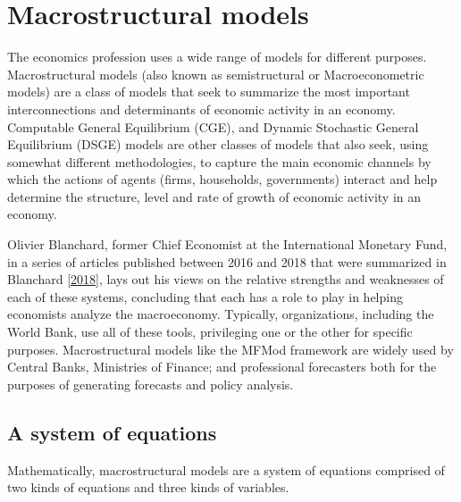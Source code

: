 \documentclass[letterpaper,10pt,english]{jupyterBook}
\begin{document}
\section{Macrostructural models}
\label{\detokenize{content/02_MacrostructuralModels/MacroStructuralModels:macrostructural-models}}\label{\detokenize{content/02_MacrostructuralModels/MacroStructuralModels::doc}}
\sphinxAtStartPar
The economics profession uses a wide range of models for different purposes.  Macro\sphinxhyphen{}structural models (also known as semi\sphinxhyphen{}structural or Macro\sphinxhyphen{}econometric models) are a class of models that seek to summarize the most important interconnections and determinants of economic activity in an economy. Computable General Equilibrium (CGE), and Dynamic Stochastic General Equilibrium (DSGE) models are other classes of models that also seek, using somewhat different methodologies, to capture the main economic channels by which the actions of agents (firms, households, governments) interact and help determine the structure, level and rate of growth of economic activity in an economy.

\sphinxAtStartPar
Olivier Blanchard, former Chief Economist at the International Monetary Fund, in a series of articles published between 2016 and 2018 that were summarized in Blanchard {[}\hyperlink{cite.content/99_BackMatter/References:id17}{2018}{]}, lays out his views on the relative strengths and weaknesses of each of these systems, concluding that each has a role to play in helping economists analyze the macro\sphinxhyphen{}economy. Typically, organizations, including the World Bank, use all of these tools, privileging one or the other for specific purposes. Macrostructural models like the MFMod framework are widely used by Central Banks, Ministries of Finance; and professional forecasters both for the purposes of generating forecasts and policy analysis.


\subsection{A system of equations}
\label{\detokenize{content/02_MacrostructuralModels/MacroStructuralModels:a-system-of-equations}}
\sphinxAtStartPar
Mathematically, macro\sphinxhyphen{}structural models are a system of equations comprised of two kinds of equations and three kinds of variables.
\end{document}
